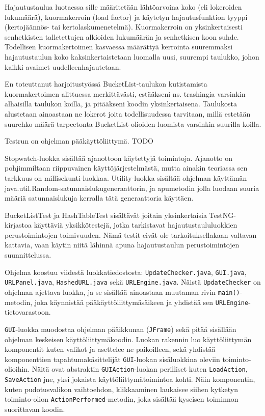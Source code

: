 \documentclass{itlaitos}
\begin{document}
Hajautustaulua luotaessa sille määritetään lähtöarvoina koko (eli lokeroiden lukumäärä), kuormakerroin (load factor) ja käytetyn hajautusfunktion tyyppi (kertojäännös- tai kertolaskumenetelmä). Kuormakerroin on yksinkertaisesti senhetkisten talletettujen alkioiden lukumäärän ja senhetkisen koon suhde. Todellisen kuormakertoimen kasvaessa määrättyä kerrointa suuremmaksi hajautustaulun koko kaksinkertaistetaan luomalla uusi, suurempi taulukko, johon kaikki avaimet uudelleenhajautetaan.

En toteuttanut harjoitustyössä BucketList-taulukon kutistamista kuormakertoimen alittuessa merkittävästi, estääkseni ns. trashingia varsinkin alhaisilla taulukon koilla, ja pitääkseni koodin yksinkertaisena. Taulukosta alustetaan ainoastaan ne lokerot joita todellisuudessa tarvitaan, millä estetään suurehko määrä tarpeetonta BucketList-olioiden luomista varsinkin suurilla koilla.

Testrun on ohjelman pääkäyttöliittymä. TODO

Stopwatch-luokka sisältää ajanottoon käytettyjä toimintoja. Ajanotto on pohjimmiltaan riippuvainen käyttöjärjestelmästä, mutta ainakin teoriassa sen tarkkuus on millisekunti-luokkaa. Utility-luokka sisältää ohjelman käyttämän java.util.Random-satunnaislukugeneraattorin, ja apumetodin jolla luodaan suuria määriä satunnaislukuja kerralla tätä generaattoria käyttäen.

BucketListTest ja HashTableTest sisältävät joitain yksinkertaisia TestNG-kirjastoa käyttäviä yksikkötestejä, jotka tarkistavat hajautustaululuokkien perustoimintojen toimivuuden. Nämä testit eivät ole tarkoituksellakaan valtavan kattavia, vaan käytin niitä lähinnä apuna hajautustaulun perustoimintojen suunnittelussa.

Ohjelma koostuu viidestä luokkatiedostosta: \texttt{UpdateChecker.java}, \texttt{GUI.java}, \texttt{URLPanel.java}, \texttt{HashedURL.java} sekä  \texttt{URLEngine.java}. Näistä \texttt{UpdateChecker} on ohjelman ajettava luokka, ja se sisältää ainoastaan muutaman rivin \texttt{main()}-metodin, joka käynnistää pääkäyttöliittymäsäikeen ja yhdistää sen \texttt{URLEngine}-tietovarastoon.

\texttt{GUI}-luokka muodostaa ohjelman pääikkunan (\texttt{JFrame}) sekä pitää sisällään ohjelman keskeisen käyttöliittymäkoodin. Luokan rakennin luo käyttöliittymän komponentit kuten valikot ja asettelee ne paikoilleen, sekä yhdistää komponenttien tapahtumakäsittelijät \texttt{GUI}-luokan sisäluokkina oleviin toiminto-olioihin. Näitä ovat abstraktin \texttt{GUIAction}-luokan perilliset kuten \texttt{LoadAction}, \texttt{SaveAction} jne, yksi jokaista käyttöliittymätoimintoa kohti. Näin komponentin, kuten pudotusvalikon vaihtoehdon, klikkaaminen laukaisee siihen kytketyn toiminto-olion \texttt{ActionPerformed}-metodin, joka sisältää kyseisen toiminnon suorittavan koodin.
\end{document}
